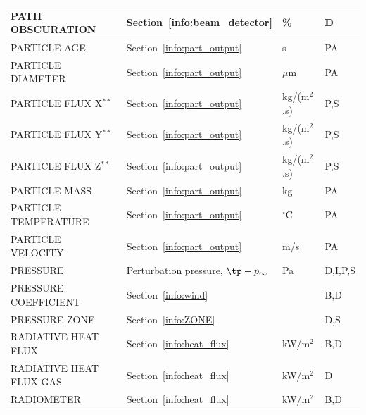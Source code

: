 \documentclass[11pt]{book}
\begin{document}
\begin{longtable}{@{\extracolsep{\fill}}|l|l|l|l|}
{\ct PATH OBSCURATION}                          & Section~\ref{info:beam_detector}              & \%             & D            \\ \hline
{\ct PARTICLE AGE}                              & Section~\ref{info:part_output}                & s              & PA           \\ \hline
{\ct PARTICLE DIAMETER}                         & Section~\ref{info:part_output}                & $\mu$m         & PA           \\ \hline
{\ct PARTICLE FLUX X}$^{**}$                    & Section~\ref{info:part_output}                & \si{kg/(m$^2$.s)} & P,S       \\ \hline
{\ct PARTICLE FLUX Y}$^{**}$                    & Section~\ref{info:part_output}                & \si{kg/(m$^2$.s)} & P,S       \\ \hline
{\ct PARTICLE FLUX Z}$^{**}$                    & Section~\ref{info:part_output}                & \si{kg/(m$^2$.s)} & P,S       \\ \hline
{\ct PARTICLE MASS}                             & Section~\ref{info:part_output}                & kg             & PA           \\ \hline
{\ct PARTICLE TEMPERATURE}                      & Section~\ref{info:part_output}                & $^\circ$C      & PA           \\ \hline
{\ct PARTICLE VELOCITY}                         & Section~\ref{info:part_output}                & m/s            & PA           \\ \hline
{\ct PRESSURE}                                  & Perturbation pressure, $\tp-p_\infty$         & Pa             & D,I,P,S      \\ \hline
{\ct PRESSURE COEFFICIENT}                      & Section~\ref{info:wind}                       &                & B,D          \\ \hline
{\ct PRESSURE ZONE}                             & Section~\ref{info:ZONE}                       &                & D,S          \\ \hline
{\ct RADIATIVE HEAT FLUX}                       & Section~\ref{info:heat_flux}                  & kW/m$^2$       & B,D          \\ \hline
{\ct RADIATIVE HEAT FLUX GAS}                   & Section~\ref{info:heat_flux}                  & kW/m$^2$       & D            \\ \hline
{\ct RADIOMETER}                                & Section~\ref{info:heat_flux}                  & kW/m$^2$       & B,D          \\ \hline

\end{longtable}
\end{document}
